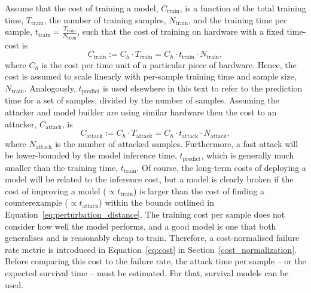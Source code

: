 Assume that the cost of training a model, $C_{\mathrm{train}}$, is a function of the total training time, $T_{\mathrm{train}}$, the number of training samples, $N_{\mathrm{train}}$, and the training time per sample, $t_{\mathrm{train}} = \frac{T_{\mathrm{train}}}{N_{\mathrm{train}}}$, such that the cost of training on hardware with a fixed time-cost is
\begin{equation}
    C_{\mathrm{train}} := C_{h} \cdot T_{\mathrm{train}} = C_h \cdot t_{\mathrm{train}} \cdot N_{\mathrm{train}},
    \label{eq:naive_cost}
\end{equation}
where $C_h$ is the cost per time unit of a particular piece of hardware. Hence, the cost is assumed to scale linearly with per-sample training time and sample size, $N_{\mathrm{train}}$.
Analogously, $t_{\mathrm{predict}}$ is used elsewhere in this text to refer to the prediction time for a set of samples, divided by the number of samples. Assuming the attacker and model builder are using similar hardware then the cost to an attacker, $C_{\mathrm{attack}}$, is
\[
    C_{\mathrm{attack}} := C_{h} \cdot T_{\mathrm{attack}} = C_h \cdot t_{\mathrm{attack}} \cdot N_{\mathrm{attack}},
\]
where $ N_{\mathrm{attack}} $ is the number of attacked samples. Furthermore, a fast attack will be lower-bounded by the model inference time, $ t_{\mathrm{predict}} $, which is generally much smaller than the training time, $ t_{\mathrm{train}} $. Of course, the long-term costs of deploying a model will be related to the inference cost, but a model is clearly broken if the cost of improving a model ($\propto t_{\mathrm{train}}$) is larger than the cost of finding a counterexample ($\propto t_{\mathrm{attack}}$) within the bounds outlined in Equation~\ref{eq:perturbation_distance}. The training cost per sample does not consider how well the model performs, and a good model is one that both generalises and is reasonably cheap to train.
Therefore, a cost-normalised failure rate metric is introduced in Equation~\ref{eq:cost} in Section~\ref{cost_normalization}. Before comparing this cost to the failure rate, the attack time per sample -- or the expected survival time --  must be estimated. For that, survival models can be used.

